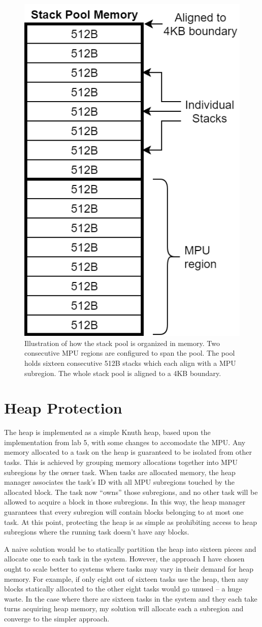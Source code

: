 \begin{figure}[hbtp]
	\centering
	\includegraphics[width=0.4\columnwidth]{figs/stack_prot.png}
	\caption{Illustration of how the stack pool is organized in memory. Two consecutive MPU regions are configured to span the pool. The pool holds sixteen consecutive 512B stacks which each align with a MPU subregion. The whole stack pool is aligned to a 4KB boundary.}
	\label{fig:stack_prot}
\end{figure}

\section{Heap Protection}

The heap is implemented as a simple Knuth heap, based upon the implementation from lab 5, with some changes to accomodate the MPU. Any memory allocated to a task on the heap is guaranteed to be isolated from other tasks. This is achieved by grouping memory allocations together into MPU subregions by the owner task. When tasks are allocated memory, the heap manager associates the task's ID with all MPU subregions touched by the allocated block. The task now ``owns'' those subregions, and no other task will be allowed to acquire a block in those subregions. In this way, the heap manager guarantees that every subregion will contain blocks belonging to at most one task. At this point, protecting the heap is as simple as prohibiting access to heap subregions where the running task doesn't have any blocks.

A naive solution would be to statically partition the heap into sixteen pieces and allocate one to each task in the system. However, the approach I have chosen ought to scale better to systems where tasks may vary in their demand for heap memory. For example, if only eight out of sixteen tasks use the heap, then any blocks statically allocated to the other eight tasks would go unused -- a huge waste. In the case where there are sixteen tasks in the system and they each take turns acquiring heap memory, my solution will allocate each a subregion and converge to the simpler approach.

